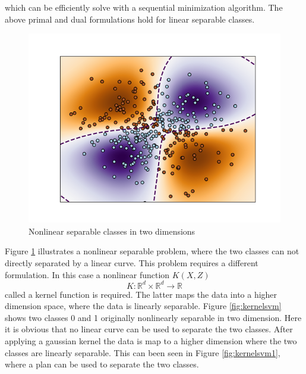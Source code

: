 \documentclass[../Main/thesis.tex]{subfiles}
\begin{document}
which can be efficiently solve with a sequential minimization algorithm. The above primal and dual formulations hold for linear separable classes. \begin{figure}[H] %
   \centering
   \includegraphics[width=5.4in]{../fig/nonlinearsvm.png} 
   \caption{Nonlinear separable classes in two dimensions}
   \label{fig:nonlinearsvm}
\end{figure}
\justify
Figure \ref{fig:nonlinearsvm} illustrates a nonlinear separable problem, where the two classes can not directly separated by a linear curve. This problem requires a different formulation. In this case a nonlinear function $K(X,Z)$
\begin{equation}
K: \mathbb{R}^{d}\times \mathbb{R}^{d} \rightarrow \mathbb{R}
\end{equation}
called a kernel function is required. The latter maps the data into a higher dimension space, where the data is linearly separable. Figure \ref{fig:kernelsvm} shows two classes 0 and 1 originally nonlinearly separable in two dimension.  Here it is obvious that no linear curve can be used to separate the two classes. After applying a gaussian kernel the data is map to a higher dimension where the two classes are linearly separable. This can been seen in Figure \ref{fig:kernelsvm1}, where a plan can be used to separate the two classes.
\end{document}
